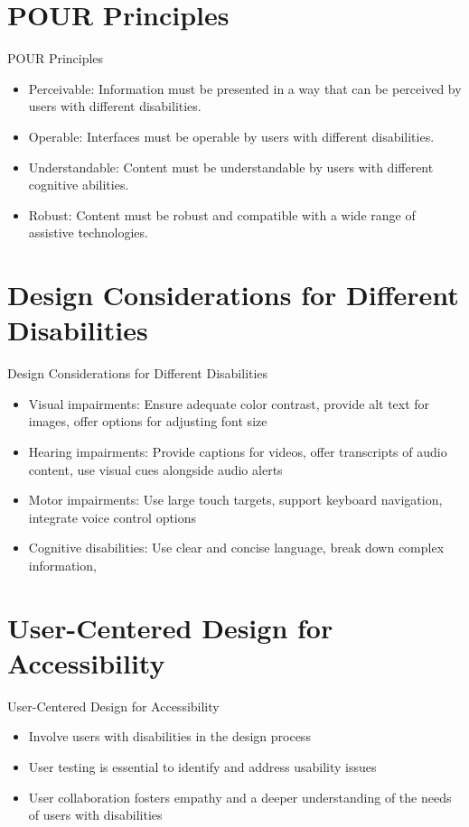 \documentclass{beamer}
\begin{document}
\section{POUR Principles}
\begin{frame}{POUR Principles}
    \begin{itemize}
        \item \alert{Perceivable:} Information must be presented in a way that can be perceived by users with different disabilities.
        \item \alert{Operable:} Interfaces must be operable by users with different disabilities.
        \item \alert{Understandable:} Content must be understandable by users with different cognitive abilities.
        \item \alert{Robust:} Content must be robust and compatible with a wide range of assistive technologies.
    \end{itemize}
\end{frame}

\section{Design Considerations for Different Disabilities}
\begin{frame}{Design Considerations for Different Disabilities}
    \begin{itemize}
        \item \alert{Visual impairments:} Ensure adequate color contrast, provide alt text for images, offer options for adjusting font size
        \item \alert{Hearing impairments:} Provide captions for videos, offer transcripts of audio content, use visual cues alongside audio alerts
        \item \alert{Motor impairments:} Use large touch targets, support keyboard navigation, integrate voice control options
        \item \alert{Cognitive disabilities:} Use clear and concise language, break down complex information,
    \end{itemize}
\end{frame}

\section{User-Centered Design for Accessibility}
\begin{frame}{User-Centered Design for Accessibility}
    \begin{itemize}
        \item Involve users with disabilities in the design process
        \item User testing is essential to identify and address usability issues
        \item User collaboration fosters empathy and a deeper understanding of the needs of users with disabilities
    \end{itemize}
\end{frame}
\end{document}
